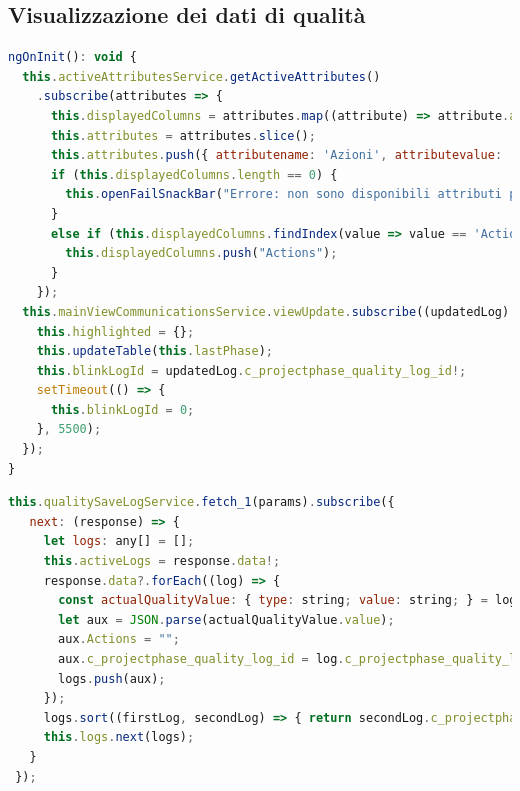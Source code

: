 
\newpage
\subsection*{Visualizzazione dei dati di qualità}
\begin{lstlisting}[language=JavaScript, caption={Aggiornamento degli attributi caratterizzanti il controllo qualità}]
ngOnInit(): void {
  this.activeAttributesService.getActiveAttributes()
    .subscribe(attributes => {
      this.displayedColumns = attributes.map((attribute) => attribute.attributevalue!);
      this.attributes = attributes.slice();
      this.attributes.push({ attributename: 'Azioni', attributevalue: 'Actions' });
      if (this.displayedColumns.length == 0) {
        this.openFailSnackBar("Errore: non sono disponibili attributi per la fase selezionata!", "X");
      }
      else if (this.displayedColumns.findIndex(value => value == 'Actions') == -1) {
        this.displayedColumns.push("Actions");
      }
    });
  this.mainViewCommunicationsService.viewUpdate.subscribe((updatedLog) => {
    this.highlighted = {};
    this.updateTable(this.lastPhase);
    this.blinkLogId = updatedLog.c_projectphase_quality_log_id!;
    setTimeout(() => {
      this.blinkLogId = 0;
    }, 5500);
  });
}
\end{lstlisting}

 \begin{lstlisting}[language=JavaScript, caption={Aggiornamento della tabella di visualizzazione dei dati di controllo qualità}]
 this.qualitySaveLogService.fetch_1(params).subscribe({
   next: (response) => {
     let logs: any[] = [];
     this.activeLogs = response.data!;
     response.data?.forEach((log) => {
       const actualQualityValue: { type: string; value: string; } = log.qualityvalue! as any;
       let aux = JSON.parse(actualQualityValue.value);
       aux.Actions = "";
       aux.c_projectphase_quality_log_id = log.c_projectphase_quality_log_id;
       logs.push(aux);
     });
     logs.sort((firstLog, secondLog) => { return secondLog.c_projectphase_quality_log_id - firstLog.c_projectphase_quality_log_id })
     this.logs.next(logs);
   }
 });
\end{lstlisting}


